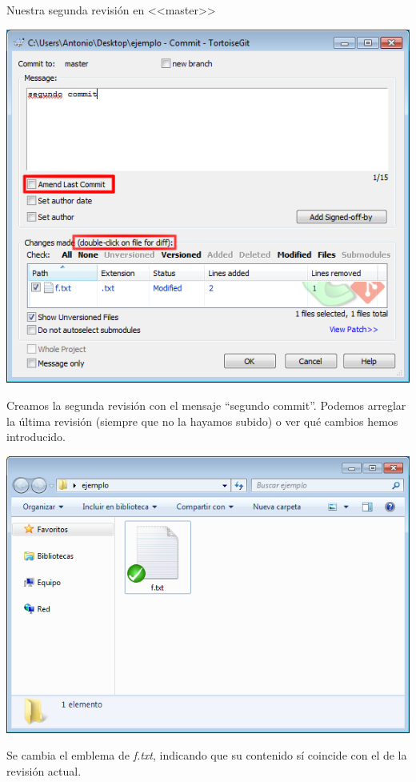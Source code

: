 \documentclass[xcolor=svgnames]{beamer}
\newcommand*{\fichero}[1]{\textit{#1}}
\begin{document}
\begin{frame}{Nuestra segunda revisión en <<master>>}
\begin{overprint}
    \begin{center}
      \includegraphics[width=\textwidth,height=.6\textheight,keepaspectratio]{tomas/segundocommit-02-dlgcommit}

      Creamos la segunda revisión con el mensaje ``segundo
      commit''. Podemos arreglar la última revisión (siempre que no la
      hayamos subido) o ver qué cambios hemos introducido.
    \end{center}

    \begin{center}
      \includegraphics[width=\textwidth,height=.6\textheight,keepaspectratio]{tomas/segundocommit-03-emblemok}

      Se cambia el emblema de \fichero{f.txt}, indicando que su contenido sí coincide con el de la revisión actual.
    \end{center}
  \end{overprint}
\end{frame}
\end{document}
